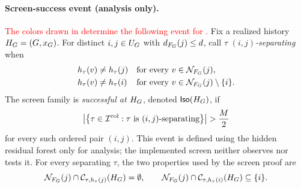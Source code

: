 \paragraph{Screen-success event (analysis only).}
\textcolor{red}{The colors drawn in  determine
the following event for .}
Fix a realized history $H_{G}=(G,x_G)$.  For distinct
$i,j\in U_{G}$ with
$d_{F_{G}}(j)\le d$, call $\tau$
\emph{$(i,j)$-separating} when
\begin{equation}
\begin{aligned}
 h_{\tau}(v)&\ne h_{\tau}(j)
   &&\text{for every }v\in\mathcal N_{F_{G}}(j),\\
 h_{\tau}(v)&\ne h_{\tau}(i)
   &&\text{for every }
   v\in\mathcal N_{F_{G}}(j)\setminus\{i\}.
\end{aligned}
\label{app:eq:pair-separating-coloring}
\end{equation}
The screen family is \emph{successful at $H_{G}$}, denoted
$\mathsf{Iso}(H_{G})$, if
\begin{equation}
 \left|
 \left\{\tau\in\ColoringIndexSet:
       \tau\text{ is $(i,j)$-separating}\right\}
 \right|>\frac{\ColoringCount}{2}
 \label{app:eq:screen-success-event}
\end{equation}
for every such ordered pair $(i,j)$.  This event is defined using the hidden
residual forest only for analysis; the implemented screen neither observes
nor tests it.  For every separating $\tau$, the two properties used by the
screen proof are
\begin{equation}
 \mathcal N_{F_{G}}(j)
 \cap\mathcal C_{\tau,h_{\tau}(j)}(H_{G})=\emptyset,
 \qquad
 \mathcal N_{F_{G}}(j)
 \cap\mathcal C_{\tau,h_{\tau}(i)}(H_{G})\subseteq\{i\}.
 \label{app:eq:pairwise-local-isolation}
\end{equation}


